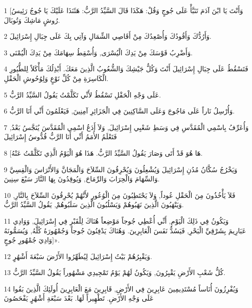 \par 1 [وَأَنْتَ يَا ابْنَ آدَمَ تَنَبَّأْ عَلَى جُوجٍ وَقُلْ: هَكَذَا قَالَ السَّيِّدُ الرَّبُّ: هَئَنَذَا عَلَيْكَ يَا جُوجُ رَئِيسُ رُوشٍ مَاشِكَ وَتُوبَالَ.
\par 2 وَأَرُدُّكَ وَأَقُودُكَ وَأُصْعِدُكَ مِنْ أَقَاصِي الشِّمَالِ وَآتِي بِكَ عَلَى جِبَالِ إِسْرَائِيلَ.
\par 3 وَأَضْرِبُ قَوْسَكَ مِنْ يَدِكَ الْيُسْرَى, وَأُسْقِطُ سِهَامَكَ مِنْ يَدِكَ الْيُمْنَى.
\par 4 فَتَسْقُطُ عَلَى جِبَالِ إِسْرَائِيلَ أَنْتَ وَكُلُّ جَيْشِكَ وَالشُّعُوبُ الَّذِينَ مَعَكَ. أَبْذِلُكَ مَأْكَلاً لِلطُّيُورِ الْكَاسِرَةِ مِنْ كُلِّ نَوْعٍ وَلِوُحُوشِ الْحَقْلِ.
\par 5 عَلَى وَجْهِ الْحَقْلِ تَسْقُطُ لأَنِّي تَكَلَّمْتُ يَقُولُ السَّيِّدُ الرَّبُّ.
\par 6 وَأُرْسِلُ نَاراً عَلَى مَاجُوجَ وَعَلَى السَّاكِنِينَ فِي الْجَزَائِرِ آمِنِينَ, فَيَعْلَمُونَ أَنِّي أَنَا الرَّبُّ.
\par 7 وَأُعَرِّفُ بِاسْمِي الْمُقَدَّسِ فِي وَسَطِ شَعْبِي إِسْرَائِيلَ, وَلاَ أَدَعُ اسْمِي الْمُقَدَّسَ يُنَجَّسُ بَعْدُ, فَتَعْلَمُ الأُمَمُ أَنِّي أَنَا الرَّبُّ قُدُّوسُ إِسْرَائِيلَ
\par 8 [هَا هُوَ قَدْ أَتَى وَصَارَ يَقُولُ السَّيِّدُ الرَّبُّ. هَذَا هُوَ الْيَوْمُ الَّذِي تَكَلَّمْتُ عَنْهُ.
\par 9 وَيَخْرُجُ سُكَّانُ مُدُنِ إِسْرَائِيلَ وَيُشْعِلُونَ وَيُحْرِقُونَ السِّلاَحَ وَالْمَجَانَّ وَالأَتْرَاسَ وَالْقِسِيَّ وَالسِّهَامَ وَالْحِرَابَ وَالرِّمَاحَ, وَيُوقِدُونَ بِهَا النَّارَ سَبْعَ سِنِينَ.
\par 10 فَلاَ يَأْخُذُونَ مِنَ الْحَقْلِ عُوداً, وَلاَ يَحْتَطِبُونَ مِنَ الْوُعُورِ لأَنَّهُمْ يُحْرِقُونَ السِّلاَحَ بِالنَّارِ, وَيَنْهَبُونَ الَّذِينَ نَهَبُوهُمْ وَيَسْلُبُونَ الَّذِينَ سَلَبُوهُمْ, يَقُولُ السَّيِّدُ الرَّبُّ.
\par 11 وَيَكُونُ فِي ذَلِكَ الْيَوْمِ, أَنِّي أُعْطِي جُوجاً مَوْضِعاً هُنَاكَ لِلْقَبْرِ فِي إِسْرَائِيلَ, وَوَادِي عَبَارِيمَ بِشَرْقِيِّ الْبَحْرِ, فَيَسُدُّ نَفَسَ الْعَابِرِينَ. وَهُنَاكَ يَدْفِنُونَ جُوجاً وَجُمْهُورَهُ كُلَّهُ, وَيُسَمُّونَهُ [وَادِيَ جُمْهُورِ جُوجٍ».
\par 12 وَيَقْبِرُهُمْ بَيْتُ إِسْرَائِيلَ لِيُطَهِّرُوا الأَرْضَ سَبْعَةَ أَشْهُرٍ.
\par 13 كُلُّ شَعْبِ الأَرْضِ يَقْبِرُونَ, وَيَكُونُ لَهُمْ يَوْمُ تَمْجِيدِي مَشْهُوراً يَقُولُ السَّيِّدُ الرَّبُّ.
\par 14 وَيُفْرِزُونَ أُنَاساً مُسْتَدِيمِينَ عَابِرِينَ فِي الأَرْضِ, قَابِرِينَ مَعَ الْعَابِرِينَ أُولَئِكَ الَّذِينَ بَقُوا عَلَى وَجْهِ الأَرْضِ. تَطْهِيراً لَهَا. بَعْدَ سَبْعَةِ أَشْهُرٍ يَفْحَصُونَ
